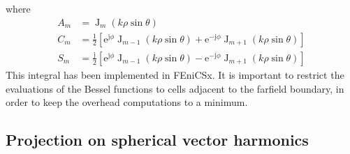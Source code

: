 \documentclass[a4paper,12pt]{article}
\newcommand{\mrm}[1]{\mathrm{#1}}
\newcommand{\ju}{\mrm{j}}
\newcommand{\eu}{\mrm{e}}
\newcommand{\BesselJ}{\operatorname{J}}
\begin{document}
where
\begin{align}
  A_{m} &= \BesselJ_{m}(k\rho\sin\theta) \\
  C_{m} &= \frac{1}{2}\left[ \eu^{\ju\phi}\BesselJ_{m-1}(k\rho\sin\theta) + \eu^{-\ju\phi}\BesselJ_{m+1}(k\rho\sin\theta) \right] \\
  S_{m} &= \frac{\ju}{2}\left[ \eu^{\ju\phi}\BesselJ_{m-1}(k\rho\sin\theta) - \eu^{-\ju\phi}\BesselJ_{m+1}(k\rho\sin\theta) \right]
\end{align}
This integral has been implemented in FEniCSx. It is important to
restrict the evaluations of the Bessel functions to cells adjacent to
the farfield boundary, in order to keep the overhead computations to a
minimum. 


\subsection{Projection on spherical vector harmonics}
\label{sec:sphericalvectorharmonics}
\end{document}
